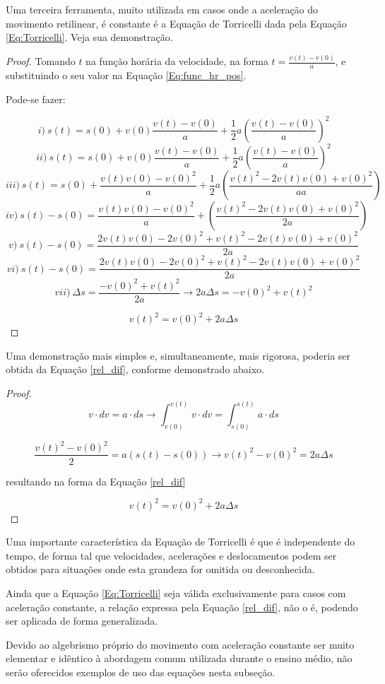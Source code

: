 \documentclass[a4paper, 11pt]{report}
\newtheorem{proof}{Demonstração}
\begin{document}
Uma terceira ferramenta, muito utilizada em casos onde a aceleração do movimento 
retilinear, é constante é a Equação de Torricelli dada pela Equação 
\ref{Eq:Torricelli}. Veja sua demonstração. 
\begin{proof}

    Tomando $t$ na função horária da velocidade, na forma 
    $t = \frac{v(t) - v(0)}{a}$, e substituindo o seu valor na Equação 
    \ref{Eq:func_hr_pos}. 

    Pode-se fazer:

    $$
    i) \: s(t) = s(0) + v(0) \frac{v(t) - v(0)}{a} + \frac{1}{2} a \left(\frac{v(t) - v(0)}{a} \right)^2
    $$
    $$
    ii) \: s(t) = s(0) + v(0) \frac{v(t) - v(0)}{a} + \frac{1}{2} a \left(\frac{v(t) - v(0)}{a} \right)^2
    $$
    $$
    iii) \: s(t) = s(0) +  \frac{v(t)v(0) - v(0)^2}{a} + \frac{1}{2} a \left(\frac{v(t)^2 - 2v(t)v(0) + v(0)^2}{a a} \right)
    $$
    $$
    iv) \: s(t) - s(0) =  \frac{v(t)v(0) - v(0)^2}{a} + \left(\frac{v(t)^2 - 2v(t)v(0) + v(0)^2}{2a} \right)
    $$
    $$
    v) \: s(t) - s(0) = \frac{2v(t)v(0) - 2v(0)^2 + v(t)^2 - 2v(t)v(0) + v(0)^2}{2a}
    $$
    $$
    vi) \: s(t) - s(0) = \frac{2v(t)v(0) - 2v(0)^2 + v(t)^2 - 2v(t)v(0) + v(0)^2}{2a}
    $$
    $$
    vii) \: \Delta s = \frac{ -v(0)^2 + v(t)^2  }{2a} \rightarrow  2a \Delta s=  -v(0)^2 + v(t)^2
    $$
    
    \begin{equation}
        \label{Eq:Torricelli}
        v(t)^2 = v(0)^2 + 2 a \Delta s
    \end{equation}
\end{proof}

Uma demonstração mais simples e, simultaneamente, mais rigorosa, poderia ser 
obtida da Equação \ref{rel_dif}, conforme demonstrado abaixo. 

\begin{proof}
    $$
    v \cdot dv = a \cdot ds \rightarrow 
    \int_{v(0)}^{v(t)} v \cdot dv =  \int_{s(0)}^{s(t)} a \cdot ds
    $$

    $$
    \frac{v(t)^2 - v(0)^2}{2} = a (s(t) - s(0)) \rightarrow v(t)^2 - v(0)^2 = 2 a \Delta s
    $$

    resultando na forma da Equação \ref{rel_dif}

    $$
    v(t)^2 = v(0)^2 + 2 a \Delta s
    $$
\end{proof}

Uma importante característica da Equação de Torricelli é que é independente do 
tempo, de forma tal que velocidades, acelerações e deslocamentos podem ser 
obtidos para situações onde esta grandeza for omitida ou desconhecida.

Ainda que a Equação \ref{Eq:Torricelli} seja válida exclusivamente para casos com 
aceleração constante, a relação expressa pela Equação \ref{rel_dif}, não o é, 
podendo ser aplicada de forma generalizada.

Devido ao algebrismo próprio do movimento com aceleração constante ser muito 
elementar e idêntico à abordagem comum utilizada durante o ensino médio, não 
serão oferecidos exemplos de uso das equações nesta subseção. 

\label{lastpage}
\end{document}
